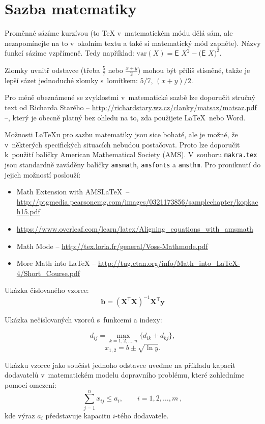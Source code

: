 \section{Sazba matematiky}
Proměnné sázíme kurzívou (to \TeX{} v~matematickém módu dělá sám, ale
nezapomínejte na to v~okolním textu a také si matematický mód zapněte).
Názvy funkcí sázíme vzpřímeně. Tedy například:
$\textrm{var} (X) = \textsf{E~} X^2 - \bigl(\textsf{E~} X \bigr)^2$.

Zlomky uvnitř odstavce (třeba $\frac{5}{7}$ nebo $\frac{x+y}{2}$) mohou
být příliš stísněné, takže je lepší sázet jednoduché zlomky s~lomítkem:
$5/7$, $(x+y)/2$.

Pro méně obeznámené se zvyklostmi v~matematické sazbě lze doporučit stručný text od Richarda Starého -- \url{http://richardstary.wz.cz/clanky/matsaz/matsaz.pdf} --, který je obecně platný bez ohledu na to, zda použijete \LaTeX\ nebo Word.

Možnosti \LaTeX u pro sazbu matematiky jsou sice bohaté, ale je možné, že v~některých specifických situacích nebudou postačovat. Proto lze doporučit k~použití balíčky American Mathematical Society (AMS). V~souboru \texttt{makra.tex} jsou standardně zaváděny balíčky \texttt{amsmath}, \texttt{amsfonts} a \texttt{amsthm}. Pro proniknutí do jejich možností poslouží:
\begin{itemize}
\item Math Extension with AMS\LaTeX\ -- \url{http://ptgmedia.pearsoncmg.com/images/0321173856/samplechapter/kopkach15.pdf}
\item \url{https://www.overleaf.com/learn/latex/Aligning_equations_with_amsmath}
\item Math Mode -- \url{http://tex.loria.fr/general/Voss-Mathmode.pdf}
\item More Math into LaTeX -- \url{http://tug.ctan.org/info/Math_into_LaTeX-4/Short_Course.pdf}
\end{itemize}

Ukázka číslovaného vzorce:
\begin{equation}
\mathbf{b}=(\mathbf{X}^\mathsf{T}\mathbf{X})^{-1}\mathbf{X}^\mathsf{T}\mathbf{y}
\end{equation}

Ukázka nečíslovaných vzorců s~funkcemi a indexy:

$$
d_{ij}=\max_{k=1,2,\dots,n} \{d_{ik}+d_{kj}\},
$$
$$
x_{1,2}=b \pm \sqrt{\ln y}.
$$

Ukázku vzorce jako součást jednoho odstavce uveďme na příkladu kapacit dodavatelů v~matematickém modelu dopravního problému, které zohledníme pomocí omezení:
\begin{equation}
\sum_{j=1}^n x_{ij} \le a_i, \qquad i=1,2,\dots,m\ ,
\end{equation}
\noindent
kde výraz $a_i$ představuje kapacitu $i$-tého dodavatele.

